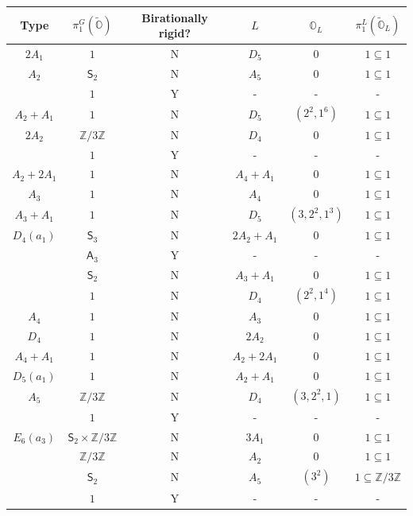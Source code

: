 \documentclass[11pt]{amsart}
\renewcommand{\O}{{\mathbb O}}
\newcommand{\bZ}{{\mathbb Z}}
\newcommand{\Alt}{{\mathsf{A}}}
\newcommand{\Sym}{{\mathsf{S}}}
\newcommand{\covO}{\widetilde{\O}}
\numberwithin{equation}{section}
\begin{document}
	
	
	\renewcommand{\arraystretch}{2}
	\begin{center}
		\begin{longtable}{|c|c|c|c|c|c|}
			\hline
			Type & $\pi_1^G(\covO)$ & Birationally rigid? & $L$ & $\O_L$ & $\pi_1^L(\covO_L)$\\ \hline
			\hline
			$2A_1$ & $1$ & N & $D_5$ & $0$ &  $1\subseteq 1$ \\
			\hline
			$A_2$ & $\Sym_2$ & N & $A_5$ & $0$ & $1\subseteq 1$ \\
			& $1$ & Y & - & - & - \\
			\hline
			$A_2+A_1$ & $1$ & N & $D_5$ & $(2^2,1^6)$ & $1\subseteq 1$ \\
			\hline
			$2A_2$ & $\bZ/3\bZ$ & N & $D_4$ & $0$ & $1\subseteq 1$ \\
			& $1$ & Y & - & - & - \\
			\hline
			$A_2+2A_1$ & $1$ & N & $A_4 + A_1$ & $0$ & $1\subseteq 1$\\
			\hline
			$A_3$ & $1$ & N & $A_4$ & $0$ & $1\subseteq 1$ \\
			\hline
			$A_3+A_1$ & $1$ & N & $D_5$ & $(3,2^2,1^3)$ & $1\subseteq 1$ \\
			\hline
			$D_4(a_1)$ & $\Sym_3$ & N & $2 A_2 + A_1$ & $0$ & $1\subseteq 1$ \\
			& $\Alt_3$ & Y & - & - & - \\
			& $\Sym_2$ & N & $A_3 + A_1$ & $0$ & $1\subseteq 1$ \\
			& $1$ & N & $D_4$ & $(2^2,1^4)$ & $1\subseteq 1$ \\
			\hline
			$A_4$ & $1$ & N & $A_3$ & $0$ & $1\subseteq 1$\\
			\hline
			$D_4$ & $1$  & N & $2 A_2$ & $0$ & $1\subseteq 1$ \\
			\hline
			$A_4+A_1$ & $1$ & N & $A_2 + 2 A_1$ & $0$ & $1\subseteq 1$ \\
			\hline
			$D_5(a_1)$ & $1$ & N & $A_2 + A_1$ & $0$ & $1\subseteq 1$\\
			\hline
			$A_5$ & $\bZ/3\bZ$ & N & $D_4$ & $(3,2^2,1)$ & $1\subseteq 1$ \\
			& $1$ & Y & - & - & - \\
			\hline
			$E_6(a_3)$ & $\Sym_2\times \bZ/3\bZ$ & N & $3 A_1$ & $0$ & $1\subseteq 1$ \\
			& $\bZ/3\bZ$ & N & $A_2$ & $0$ & $1\subseteq 1$ \\
			& $\Sym_2$ & N & $A_5$ & $(3^2)$ & $1\subseteq \bZ/3\bZ$ \\
			& $1$ & Y & - & - & - \\

\end{longtable}
\end{center}
\end{document}
